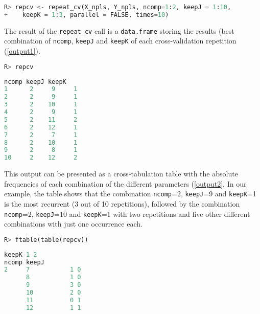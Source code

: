 \vspace{15pt}
\begin{lstlisting}[basicstyle=\small, language=Python]
R> repcv <- repeat_cv(X_npls, Y_npls, ncomp=1:2, keepJ = 1:10, 
+    keepK = 1:3, parallel = FALSE, times=10)
\end{lstlisting}

The result of the \texttt{repeat\_cv} call is a \texttt{data.frame} storing the results (best combination of \texttt{ncomp}, \texttt{keepJ} and \texttt{keepK} of each cross-validation repetition (\autoref{output1}). 

\vspace{15pt}
\begin{lstlisting}[basicstyle=\small, language=Python]
R> repcv
\end{lstlisting}

\vspace{5pt}
\begin{lstlisting}[basicstyle=\small, backgroundcolor=\color{output}, numbers=none, label={output1}, language=Python, caption=Results of \texttt{repeat\_cv} function.]
   ncomp keepJ keepK
1      2     9     1
2      2     9     1
3      2    10     1
4      2     9     1
5      2    11     2
6      2    12     1
7      2     7     1
8      2    10     1
9      2     8     1
10     2    12     2
\end{lstlisting}

This output can be presented as a cross-tabulation table with the absolute frequencies of each combination of the different parameters (\autoref{output2}. In our example, the table shows that the combination \texttt{ncomp}=2, \texttt{keepJ}=9 and \texttt{keepK}=1 is the most recurrent (3 out of 10 repetitions), followed by the combination \texttt{ncomp}=2, \texttt{keepJ}=10 and \texttt{keepK}=1 with two repetitions and five other different combinations with just one occurrence each.

\vspace{15pt}
\begin{lstlisting}[basicstyle=\small, language=Python]
R> ftable(table(repcv))
\end{lstlisting}

\begin{lstlisting}[basicstyle=\small, backgroundcolor=\color{output}, numbers=none, label={output2}, language=Python, caption=Cross-tabulation table of the results of \texttt{repeat\_cv}.]
            keepK 1 2
ncomp keepJ          
2     7           1 0
      8           1 0
      9           3 0
      10          2 0
      11          0 1
      12          1 1
\end{lstlisting}

